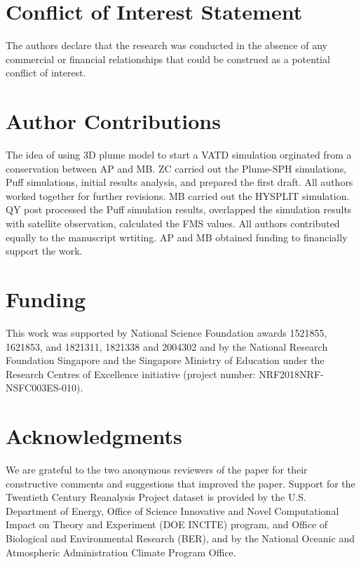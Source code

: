 \documentclass[utf8]{frontiersSCNS} %
\begin{document}
\section*{Conflict of Interest Statement}

The authors declare that the research was conducted in the absence of any commercial or financial relationships that could be construed as a potential conflict of interest.

\section*{Author Contributions}
The idea of using 3D plume model to start a VATD simulation orginated from a conservation between AP and MB. ZC carried out the Plume-SPH simulations, Puff simulations, initial results analysis, and prepared the first draft. All authors worked together for further revisions.  MB carried out the HYSPLIT simulation. QY post processed the Puff simulation results, overlapped the simulation results with satellite observation, calculated the FMS values. All authors contributed equally to the manuscript wrtiting. AP and MB obtained funding to financially support the work.

\section*{Funding}
This work was supported by National Science Foundation awards 1521855, 1621853, and 1821311, 1821338  and 2004302 and by the National Research Foundation Singapore and the Singapore Ministry of Education under the Research Centres of Excellence initiative (project number: NRF2018NRF-NSFC003ES-010). 

\section*{Acknowledgments}
We are grateful to the two anonymous reviewers of the paper for their constructive comments and suggestions that improved the paper. Support for the Twentieth Century Reanalysis Project dataset is provided by the U.S. Department of Energy, Office of Science Innovative and Novel Computational Impact on Theory and Experiment (DOE INCITE) program, and Office of Biological and Environmental Research (BER), and by the National Oceanic and Atmospheric Administration Climate Program Office.
\end{document}
